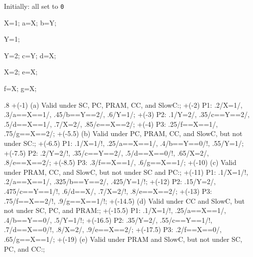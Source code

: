 \begin{parcodes}[t]%
\begin{parcol}{.15\linewidth}
Initially: all set to \lstinline|0|
\begin{parcode}{\linewidth}%
\begin{lstcode}[variable={X,Y,a,b}]
X=1;
a=X;
b=Y;

Y=1;
\end{lstcode}%
\end{parcode}%
\begin{parcode}{\linewidth}%
\begin{lstcode}[variable={X,Y,c,d,e}]
Y=2;
c=Y;
d=X;

X=2;
e=X;
\end{lstcode}%
\end{parcode}%
\begin{parcode}{\linewidth}%
\begin{lstcode}[variable={X,Y,f,g}]
f=X;
g=X;
\end{lstcode}%
\end{parcode}%
\end{parcol}\hfill%
\begin{parfig}{.8\linewidth}
	\memlabel	+(-1)		{(a) Valid under \acs{SC}, \acs{PC}, \acs{PRAM}, \acs{CC}, and \acs*{SlowC}:};
	\memops		+(-2)		{P1}: {.2/X=1/, .3/a==X==1/, .45/b==Y==2/, .6/Y=1/};
	\memops		+(-3)		{P2}: {.1/Y=2/, .35/c==Y==2/, .5/d==X==1/, .7/X=2/, .85/e==X==2/};
	\memops		+(-4)		{P3}: {.25/f==X==1/, .75/g==X==2/};
	\memlabel	+(-5.5)		{(b) Valid under \acs{PC}, \acs{PRAM}, \acs{CC}, and \acs*{SlowC}, but not under \acs{SC}:};
	\memops		+(-6.5)		{P1}: {.1/X=1/!, .25/a==X==1/, .4/b==Y==0/!, .55/Y=1/};
	\memops		+(-7.5)		{P2}: {.2/Y=2/!, .35/c==Y==2/, .5/d==X==0/!, .65/X=2/, .8/e==X==2/};
	\memops		+(-8.5)		{P3}: {.3/f==X==1/, .6/g==X==1/};
	\memlabel	+(-10)		{(c) Valid under \acs{PRAM}, \acs{CC}, and \acs*{SlowC}, but not under \acs{SC} and \acs{PC}:};
	\memops		+(-11)		{P1}: {.1/X=1/!, .2/a==X==1/, .325/b==Y==2/, .425/Y=1/!};
	\memops		+(-12)		{P2}: {.15/Y=2/, .475/c==Y==1/!, .6/d==X/, .7/X=2/!, .8/e==X==2/};
	\memops		+(-13)		{P3}: {.75/f==X==2/!, .9/g==X==1/!};
	\memlabel	+(-14.5)	{(d) Valid under \acs{CC} and \acs*{SlowC}, but not under \acs{SC}, \acs{PC}, and \acs{PRAM}:};
	\memops		+(-15.5)	{P1}: {.1/X=1/!, .25/a==X==1/, .4/b==Y==0/, .5/Y=1/!};
	\memops		+(-16.5)	{P2}: {.35/Y=2/, .55/c==Y==1/!, .7/d==X==0/!, .8/X=2/, .9/e==X==2/};
	\memops		+(-17.5)	{P3}: {.2/f==X==0/, .65/g==X==1/};
	\memlabel	+(-19)		{(e) Valid under \acs{PRAM} and \acs*{SlowC}, but not under \acs{SC}, \acs{PC}, and \acs{CC}:};

\end{parfig}
\end{parcodes}
